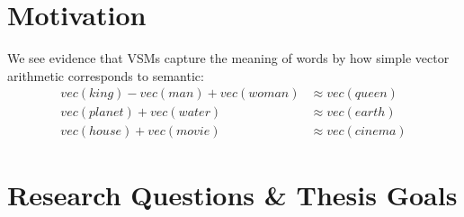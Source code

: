 \section{Motivation}


We see evidence that VSMs capture the meaning of words by how simple vector arithmetic corresponds to semantic: 
\begin{align}
	vec(king) - vec(man) + vec(woman) &\approx vec(queen) \nonumber \\ 
	vec(planet) + vec(water) &\approx vec(earth)  \label{eq:w2vregularity}\\
	vec(house) + vec(movie) &\approx vec(cinema) \nonumber
\end{align}


\section{Research Questions \& Thesis Goals}
\label{sec:goals_research_questions}

